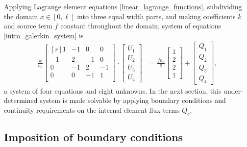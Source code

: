 Applying Lagrange element equations \cref{linear_lagrange_functions}, subdividing the domain $x \in [0,\ell]$ into three equal width parts, and making coefficients $k$ and source term $f$ constant throughout the domain, system of equations \cref{intro_galerkin_system} is 
\begin{align} 
  \label{intro_expanded_global_system}
  \frac{k}{h_e}
  \begin{bmatrix}[r]
     1 & -1 &  0 &  0 \\
    -1 &  2 & -1 &  0 \\
     0 & -1 &  2 & -1 \\
     0 &  0 & -1 &  1 \\
  \end{bmatrix} \cdot
  \begin{bmatrix} U_1 \\ U_2 \\ U_3 \\ U_4 \end{bmatrix} &=
  \frac{f h_e}{2}
  \begin{bmatrix} 1   \\ 2   \\ 2   \\ 1   \end{bmatrix} +
  \begin{bmatrix} Q_1 \\ Q_2 \\ Q_3 \\ Q_4 \end{bmatrix},
\end{align}
a system of four equations and eight unknowns.  In the next section, this under-determined system is made solvable by applying boundary conditions and continuity requirements on the internal element flux terms $Q_e$.

\subsection{Imposition of boundary conditions}
  
